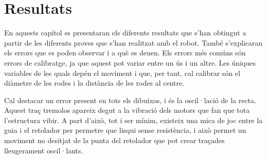 \setlength\topmargin{8mm}
\onehalfspacing
\chapter{Resultats} %

\label{Chapter5} %


En aquests capítol es presentaran els diferents resultats que s'han obtingut a partir de les diferents proves que s'han realitzat amb el robot. També s'explicaran els errors que es poden observar i a què es deuen. Els errors més comúns són errors de calibratge, ja que aquest pot variar entre un ús i un altre. Les úniques variables de les quals depén el moviment i que, per tant, cal calibrar són el diàmetre de les rodes i la distància de les rodes al centre. 

Cal destacar un error present en tots els dibuixos, i és la oscil·lació de la recta. Aquest traç tremolos apareix degut a la vibració dels motors que fan que tota l'estructura vibir. A part d'això, tot i ser mínim, existeix una mica de joc entre la guia i el retolador per permetre que lisqui sense resistència, i això permet un moviment no desitjat de la punta del retolador que pot crear traçades lleugerament oscil·lants.

